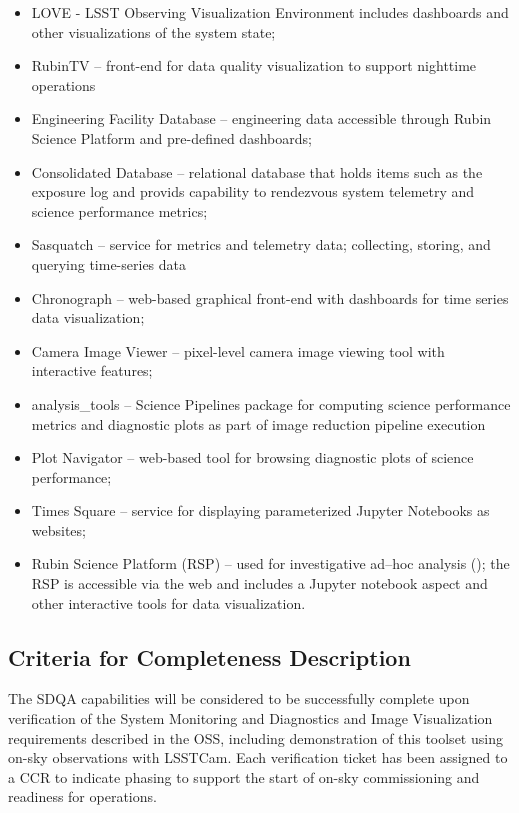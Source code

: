 \begin{itemize}

	\item LOVE - LSST Observing Visualization Environment includes dashboards and other visualizations of the system state;
	\item RubinTV -- front-end for data quality visualization to support nighttime operations
	\item Engineering Facility Database -- engineering data accessible through Rubin Science Platform and pre-defined dashboards;
	\item Consolidated Database -- relational database that holds items such as the exposure log and provids capability to rendezvous system telemetry and science performance metrics;
	\item Sasquatch -- service for metrics and telemetry data; collecting, storing, and querying time-series data
	\item Chronograph -- web-based graphical front-end with dashboards for time series data visualization;
	\item Camera Image Viewer -- pixel-level camera image viewing tool with interactive features;
	\item analysis\_tools -- Science Pipelines package for computing science performance metrics and diagnostic plots as part of image reduction pipeline execution
	\item Plot Navigator -- web-based tool for browsing diagnostic plots of science performance;
	\item Times Square -- service for displaying parameterized Jupyter Notebooks as websites;
	\item Rubin Science Platform (RSP) -- used for investigative ad--hoc analysis (); the RSP is accessible via the web and includes a Jupyter notebook aspect and other interactive tools for data visualization.

\end{itemize}

\subsection{Criteria for Completeness Description}

The SDQA capabilities will be considered to be successfully complete upon verification of the System Monitoring and Diagnostics and Image Visualization requirements described in the OSS, including demonstration of this toolset using on-sky observations with LSSTCam.
Each verification ticket has been assigned to a CCR to indicate phasing to support the start of on-sky commissioning and readiness for operations.

